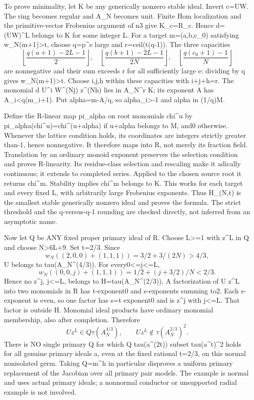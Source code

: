 \documentclass[11pt]{article}
\begin{document}
To prove minimality, let K be any generically nonzero stable ideal. Invert c=UW. The ring becomes regular and A\_N becomes unit. Finite Hom localization and the primitive-vector Frobenius argument of n3 give K\_c=R\_c. Hence d=(UW)\textasciicircum{}L belongs to K for some integer L. For a target m=(a,b,c\_0) satisfying w\_N(m+1)>t, choose q=p\textasciicircum{}e large and r=ceil(t(q-1)). The three capacities
\[
\left\lfloor\frac{q(a+1)-2L-1}{2}\right\rfloor,
\quad\left\lfloor\frac{q(b+1)-2L-1}{2N}\right\rfloor,
\quad\left\lfloor\frac{q(c_0+1)-1}{N}\right\rfloor
\]
are nonnegative and their sum exceeds r for all sufficiently large e: dividing by q gives w\_N(m+1)>t. Choose i,j,h within these capacities with i+j+h=r. The monomial d U\textasciicircum{}i W\textasciicircum{}(Nj) z\textasciicircum{}(Nh) lies in A\_N\textasciicircum{}r K; its exponent A has A\_i<q(m\_i+1). Put alpha=m-A/q, so alpha\_i>-1 and alpha in (1/q)M.

Define the R-linear map pi\_alpha on root monomials chi\textasciicircum{}u by pi\_alpha(chi\textasciicircum{}u)=chi\textasciicircum{}(u+alpha) if u+alpha belongs to M, and0 otherwise. Whenever the lattice condition holds, its coordinates are integers strictly greater than-1, hence nonnegative. It therefore maps into R, not merely its fraction field. Translation by an ordinary monoid exponent preserves the selection condition and proves R-linearity. Its residue-class selection and rescaling make it adically continuous; it extends to completed series. Applied to the chosen source root it returns chi\textasciicircum{}m. Stability implies chi\textasciicircum{}m belongs to K. This works for each target and every fixed L, with arbitrarily large Frobenius exponents. Thus H\_(N,t) is the smallest stable generically nonzero ideal and proves the formula. The strict threshold and the q-versus-q-1 rounding are checked directly, not inferred from an asymptotic name.

Now let Q be ANY fixed proper primary ideal of R. Choose L>=1 with z\textasciicircum{}L in Q and choose N>6L+9. Set t=2/3. Since
\[
w_N((2,0,0)+(1,1,1))=3/2+3/(2N)>4/3,
\]
U belongs to tau(A\_N\textasciicircum{}(4/3)). For every0<=j<=L,
\[
w_N((0,0,j)+(1,1,1))=1/2+(j+3/2)/N<2/3.
\]
Hence no z\textasciicircum{}j, j<=L, belongs to H=tau(A\_N\textasciicircum{}(2/3)). A factorization of U z\textasciicircum{}L into two monomials in R has t-exponent0 and s-exponents summing to2. Each s-exponent is even, so one factor has s=t exponent0 and is z\textasciicircum{}j with j<=L. That factor is outside H. Monomial ideal products have ordinary monomial membership, also after completion. Therefore
\[
U z^L\in Q\tau(A_N^{4/3}),\qquad
U z^L\notin\tau(A_N^{2/3})^2.
\]
There is NO single primary Q for which Q tau(a\textasciicircum{}(2t)) subset tau(a\textasciicircum{}t)\textasciicircum{}2 holds for all genuine primary ideals a, even at the fixed rational t=2/3, on this normal nonisolated germ. Taking Q=m\textasciicircum{}h in particular disproves a uniform primary replacement of the Jacobian over all primary pair models. The example is normal and uses actual primary ideals; a nonnormal conductor or unsupported radial example is not involved.
\end{document}
